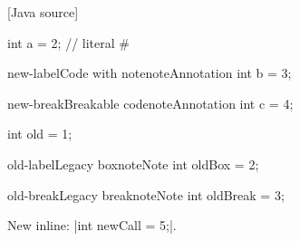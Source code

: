\documentclass{article}
\begin{document}

[Java source]

\begin{miniCode}
int a = 2; // literal # %
\end{miniCode}
\begin{CodeBox}{new-label}{Code with note}{note}{Annotation}
int b = 3;
\end{CodeBox}
\begin{CodeBox*}{new-break}{Breakable code}{note}{Annotation}
int c = 4;
\end{CodeBox*}
\begin{miniCode}
int old = 1;
\end{miniCode}
\begin{CodeBox}{old-label}{Legacy box}{note}{Note}
int oldBox = 2;
\end{CodeBox}
\begin{CodeBox*}{old-break}{Legacy break}{note}{Note}
int oldBreak = 3;
\end{CodeBox*}
New inline: \pxCodeInline[pxJava]|int newCall = 5;|.
\end{document}
